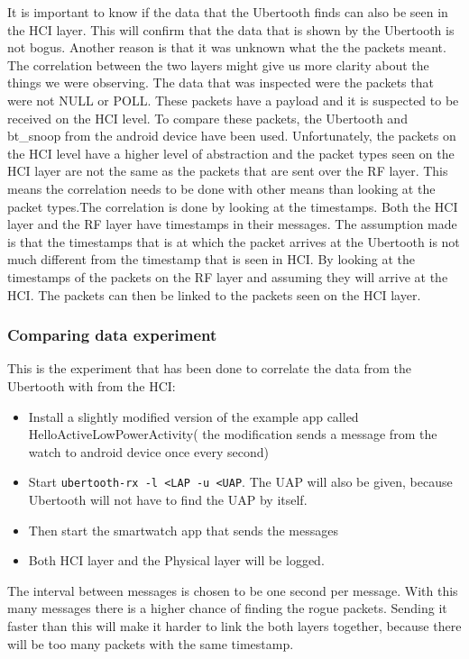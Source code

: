 It is important to know if the data that the Ubertooth finds can also be seen in the HCI layer. This will confirm that the data that is shown by the Ubertooth is not bogus. Another reason is that it was unknown what the the packets meant. The correlation between the two layers might give us more clarity about the things we were observing. The data that was inspected were the packets that were not NULL or POLL. These packets have a payload and it is suspected to be received on the HCI level. To compare these packets, the Ubertooth and bt\_snoop from the android device have been used. Unfortunately, the packets on the HCI level have a higher level of abstraction and the packet types seen on the HCI layer are not the same as the packets that are sent over the RF layer. This means the correlation needs to be done with other means than looking at the packet types.\pend The correlation is done by looking at the timestamps. Both the HCI layer and the RF layer have timestamps in their messages. The assumption made is that the timestamps that is at which the packet arrives at the Ubertooth is not much different from the timestamp that is seen in HCI. By looking at the timestamps of the packets on the RF layer and assuming they will arrive at the HCI. The packets can then be linked to the packets seen on the HCI layer.
\subsubsection{Comparing data experiment}
This is the experiment that has been done to correlate the data from the Ubertooth with from the HCI:
\begin{itemize}
\item Install a slightly modified version of the example app called HelloActiveLowPowerActivity( the modification sends a message from the watch to android device once every second)
\item Start \verb|ubertooth-rx -l <LAP -u <UAP|. The UAP will also be given, because Ubertooth will not have to find the UAP by itself. 
\item Then start the smartwatch app that sends the messages
\item Both HCI layer and the Physical layer will be logged.
\end{itemize}
The interval between messages is chosen to be one second per message. With this many messages there is a higher chance of finding the rogue packets. Sending it faster than this will make it harder to link the both layers together, because there will be too many packets with the same timestamp.